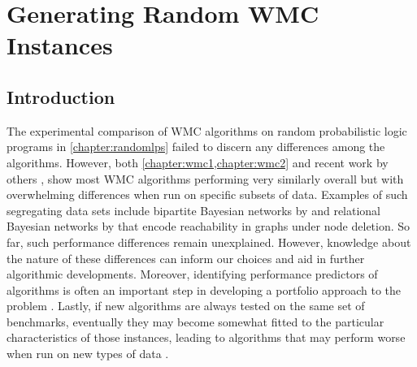 \chapter{Generating Random WMC Instances}\label{chapter:comparison}

\section{Introduction}



The experimental comparison of WMC algorithms on random probabilistic logic
programs in \cref{chapter:randomlps} failed to discern any differences among the
algorithms. However, both \cref{chapter:wmc1,chapter:wmc2} and recent work by
others
\citep{DBLP:conf/aaai/DudekPV20,DBLP:conf/cp/DudekPV20,DBLP:conf/ijcai/LagniezM17},
show most WMC algorithms performing very similarly overall but with overwhelming
differences when run on specific subsets of data. Examples of such segregating
data sets include bipartite Bayesian networks by \citet{DBLP:conf/aaai/SangBK05}
and relational Bayesian networks by \citet{DBLP:journals/ijar/ChaviraDJ06} that
encode reachability in graphs under node deletion. So far, such performance
differences remain unexplained. However, knowledge about the nature of these
differences can inform our choices and aid in further algorithmic developments.
Moreover, identifying performance predictors of algorithms is often an important
step in developing a portfolio approach to the problem
\citep{DBLP:journals/jair/XuHHL08}. Lastly, if new algorithms are always tested
on the same set of benchmarks, eventually they may become somewhat fitted to the
particular characteristics of those instances, leading to algorithms that may
perform worse when run on new types of data \citep{DBLP:conf/cec/HossainALA10}.

